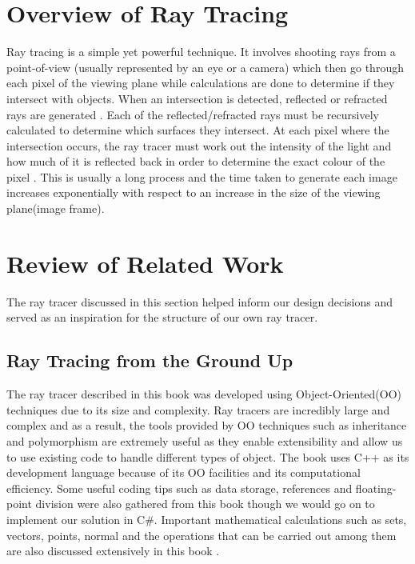 \documentclass[a4paper]{report}
\begin{document}
	
	\section{Overview of Ray Tracing}
	\par Ray tracing is a simple yet powerful technique. It involves shooting rays from a point-of-view (usually represented by an eye or a camera) which then go through each pixel of the viewing plane while calculations are done to determine if they intersect with objects. When an intersection is detected, reflected or refracted rays are generated \cite{weghorst_improved_1984}. Each of the reflected/refracted rays must be recursively calculated to determine which surfaces they intersect. At each pixel where the intersection occurs, the ray tracer must work out the intensity of the light and how much of it is reflected back in order to determine the exact colour of the pixel \cite{suffern_ray_2007}. This is usually a long process and the time taken to generate each image increases exponentially with respect to an increase in the size of the viewing plane(image frame).\newline
	
	\section{Review of Related Work} \label{sec:review-of-tracers}
	\par The ray tracer discussed in this section helped inform our design decisions and served as an inspiration for the structure of our own ray tracer.
	
	\subsection{Ray Tracing from the Ground Up}
	\par The ray tracer described in this book was developed using Object-Oriented(OO) techniques due to its size and complexity. Ray tracers are incredibly large and complex and as a result, the tools provided by OO techniques such as inheritance and polymorphism are extremely useful as they enable extensibility and allow us to use existing code to handle different types of object. The book uses C++ as its development language because of its OO facilities and its computational efficiency. Some useful coding tips such as data storage, references and floating-point division were also gathered from this book though we would go on to implement our solution in C\#. Important mathematical calculations such as sets, vectors, points, normal and the operations that can be carried out among them are also discussed extensively in this book \cite{suffern_ray_2007}.
	\label{sssec:book}\newline
	
\end{document}
